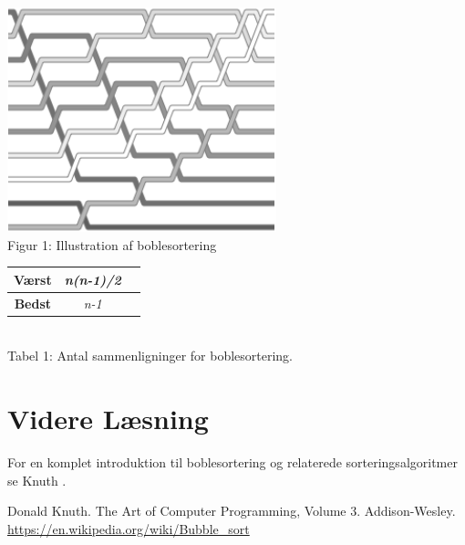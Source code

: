 \documentclass{article}
\begin{document}
\begin{center}
\includegraphics[scale=0.5]{images/image.png}
\vspace{0.3 cm}
\\Figur 1: Illustration af boblesortering\\
\vspace{0.3 cm}
\begin{tabular}{ |c|c|c| } 
 \hline
 \textbf{Værst} & \textit{n(n-1)/2} \\ 
 \hline
 \textbf{Bedst} & \textit{n-1}\\ 
 \hline
\end{tabular}
\vspace{0.3 cm}
\\Tabel 1: Antal sammenligninger for boblesortering.
\end{center}

\section{Videre Læsning}
For en komplet introduktion til boblesortering og relaterede sorteringsalgoritmer
se Knuth \cite{1}.


\begin{thebibliography}{}
    Donald Knuth. The Art of Computer Programming, Volume 3. Addison-Wesley.
    \href{https://en.wikipedia.org/wiki/Bubble_sort}{https://en.wikipedia.org/wiki/Bubble\_sort}
\end{thebibliography}
\end{document}
